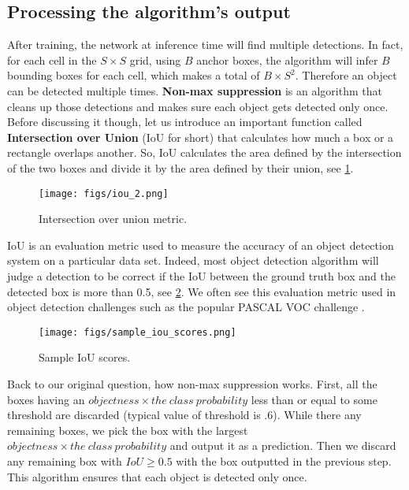 \subsection{Processing the algorithm's output}\label{IOU}

After training, the network at inference time will find multiple detections. In fact, for each cell in the $S \times S$ grid, using $B$ anchor
boxes, the algorithm will infer $B$ bounding boxes for each cell, which makes a total of $B \times S^2$. Therefore an object can be detected
multiple times.  \textbf{Non-max suppression} is an algorithm that cleans up those detections and makes sure each object gets detected only once.
Before discussing it though, let us introduce an important function called \textbf{Intersection over Union} (IoU for short) that calculates how much
a box or a rectangle overlaps another. So, IoU calculates the area defined by the intersection of the two boxes and divide it by the area defined by
their union, see \cref{fig:iou}.

\begin{figure}[!htbp]
  \centering
  \texttt{[image: figs/iou\_2.png]}
  \caption{Intersection over union metric.}\label{fig:iou}
\end{figure}

IoU is an evaluation metric used to measure the accuracy of an object detection system on a particular data set. Indeed, most object detection
algorithm will judge a detection to be correct if the IoU between the ground truth box and the detected box is more than 0.5, see
\cref{fig:iou_sample}. We often see this evaluation metric used in object detection challenges such as the popular PASCAL VOC challenge \cite{pascal}. \\

\begin{figure}[!htbp]
  \centering
  \texttt{[image: figs/sample\_iou\_scores.png]}
  \caption{Sample IoU scores.}\label{fig:iou_sample}
\end{figure}

Back to our original question, how non-max suppression works. First, all the boxes having an $objectness \times the\ class\ probability$ less than or
equal to some threshold are discarded (typical value of threshold is .6). While there any remaining boxes, we pick the box with the largest $objectness
\times the\ class\ probability$ and output it as a prediction. Then we discard any remaining box with $IoU \geq 0.5$ with the box outputted in the
previous step. This algorithm ensures that each object is detected only once. \\


